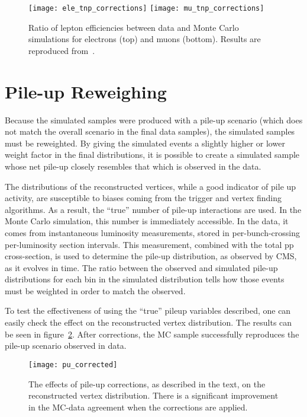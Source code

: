 \begin{figure}[h] \centering
\texttt{[image: ele\_tnp\_corrections]} 
\texttt{[image: mu\_tnp\_corrections]}\\
\caption[Ratio of lepton efficiencies between data and monte carlo simulations
for electrons and muons.]{Ratio of lepton efficiencies between data and Monte Carlo simulations
    for electrons (top) and muons (bottom). Results are reproduced
from~\cite{zzAN}.}
\label{fig:tnpResults}
\end{figure}

\section{Pile-up Reweighing}
\label{sub:pileup}
Because the simulated samples were produced with a pile-up scenario
(which does not match the overall scenario in the final data samples), the
simulated samples must be reweighted. By giving the simulated events a slightly
higher or lower weight factor in the final distributions, it is possible to
create a simulated sample whose net pile-up closely resembles that which is
observed in the data.

The distributions of the reconstructed vertices, while a good indicator of pile
up activity, are susceptible to biases coming from the trigger and vertex
finding algorithms. As a result, the ``true'' number of pile-up interactions are
used. In the Monte Carlo simulation, this number is immediately accessible. In
the data, it comes from instantaneous luminosity measurements, stored in
per-bunch-crossing per-luminosity section intervals. This measurement, combined
with the total pp cross-section, is used to determine the pile-up distribution,
as observed by CMS, as it evolves in time. The ratio between the observed and
simulated pile-up distributions for each bin in the simulated distribution tells
how those events must be weighted in order to match the observed.

To test the effectiveness of using the ``true'' pileup variables described, one
can easily check the effect on the reconstructed vertex distribution.  The
results can be seen in figure~\ref{fig:puCorrs}. After corrections, the MC
sample successfully reproduces the pile-up scenario observed in data.
\begin{figure}[h]
\centering
\texttt{[image: pu\_corrected]}
\caption[The effects of pile-up corrections on the rectonstructed vertex
distribtion.]{The effects of pile-up corrections, as described in the text, on
the reconstructed vertex distribution. There is a significant improvement in the
MC-data agreement when the corrections are applied.}
\label{fig:puCorrs}
\end{figure}


